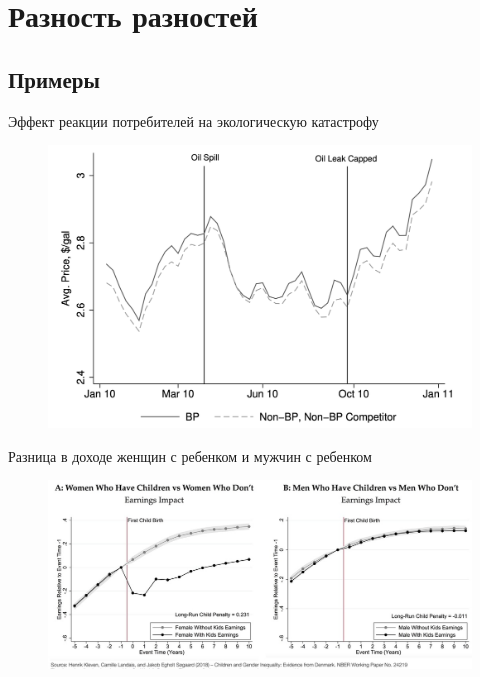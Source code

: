 


\section{Разность разностей}
\subsection{Примеры}

\begin{frame}{Эффект реакции потребителей на экологическую катастрофу}
\begin{figure}
    \centering
    \includegraphics[width=\textwidth]{Images/oil.png}
    \label{fig:my_label}
\end{figure}
\end{frame}

\begin{frame}{Разница в доходе женщин с ребенком и мужчин с ребенком}
\begin{figure}
    \centering
    \includegraphics[width=\textwidth]{Images/gender.jpg}
    \label{fig:my_label}
\end{figure}
\end{frame}

